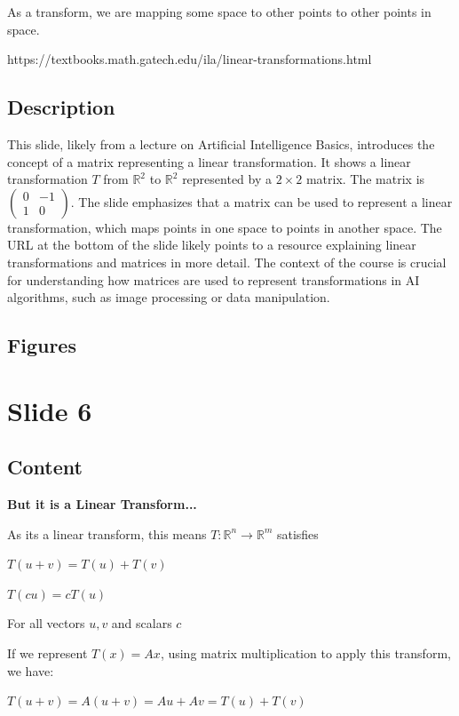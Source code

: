 \documentclass{article}%
\begin{document}
As a transform, we are mapping some space to other points to other points in space.

https://textbooks.math.gatech.edu/ila/linear-transformations.html
%
\subsection{Description}%
This slide, likely from a lecture on Artificial Intelligence Basics, introduces the concept of a matrix representing a linear transformation.  It shows a linear transformation $T$ from $\mathbb{R}^2$ to $\mathbb{R}^2$ represented by a $2 \times 2$ matrix. The matrix is $\begin{pmatrix} 0 & -1 \\ 1 & 0 \end{pmatrix}$. The slide emphasizes that a matrix can be used to represent a linear transformation, which maps points in one space to points in another space. The URL at the bottom of the slide likely points to a resource explaining linear transformations and matrices in more detail.  The context of the course is crucial for understanding how matrices are used to represent transformations in AI algorithms, such as image processing or data manipulation.%
\subsection{Figures}%
\begin{figure}[H]%
\centering%
\end{figure}

%
\newpage%
\section{Slide 6}%
\label{sec:Slide6}%
\subsection{Content}%

\textbf{But it is a Linear Transform...}

As its a linear transform, this means $T: \mathbb{R}^n \rightarrow \mathbb{R}^m$ satisfies

$T(u + v) = T(u) + T(v)$

$T(cu) = cT(u)$

For all vectors $u, v$ and scalars $c$

If we represent $T(x) = Ax$, using matrix multiplication to apply this transform, we have:

$T(u + v) = A(u + v) = Au + Av = T(u) + T(v)$
\end{document}
